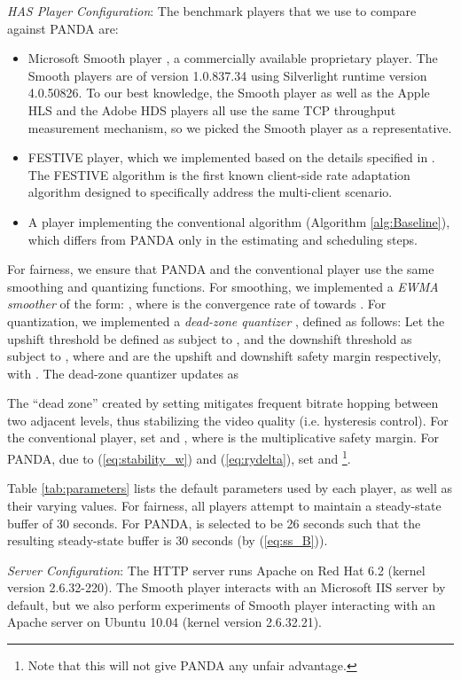 \documentclass[conference]{IEEEtran}
\theoremstyle{plain}
\theoremstyle{definition}
\theoremstyle{plain}
\theoremstyle{plain}
\begin{document}
\emph{HAS Player Configuration}: The benchmark players that we use
to compare against PANDA are:
\begin{itemize}
\item Microsoft Smooth player \cite{MSS}, a commercially available proprietary
player. The Smooth players are of version 1.0.837.34 using Silverlight
runtime version 4.0.50826. To our best knowledge, the Smooth player
as well as the Apple HLS and the Adobe HDS players all use the same
TCP throughput measurement mechanism, so we picked the Smooth player
as a representative.
\item FESTIVE player, which we implemented based on the details specified
in \cite{Jiang:CoNext12}. The FESTIVE algorithm is the first known
client-side rate adaptation algorithm designed to specifically address
the multi-client scenario.
\item A player implementing the conventional algorithm (Algorithm \ref{alg:Baseline}),
which differs from PANDA only in the estimating and scheduling steps.
\end{itemize}
For fairness, we ensure that PANDA and the conventional player use
the same smoothing and quantizing functions. For smoothing, we implemented
a \emph{EWMA} \emph{smoother} of the form: ,
where  is the convergence rate of  towards
. For quantization, we implemented a \emph{dead-zone
quantizer} , defined as follows: Let the
upshift threshold be defined as  subject to , and the downshift threshold
as  subject to , where 
and  are the upshift and downshift safety margin respectively,
with . The dead-zone quantizer
updates  as 

The ``dead zone''  created by setting 
mitigates frequent bitrate hopping between two adjacent levels, thus
stabilizing the video quality (i.e. hysteresis control). For the conventional
player, set  and ,
where  is the multiplicative safety margin. For
PANDA, due to (\ref{eq:stability_w}) and (\ref{eq:rydelta}), set
 and  \footnote{Note that this will not give PANDA any unfair advantage.}.

Table \ref{tab:parameters} lists the default parameters used by each
player, as well as their varying values. For fairness, all players
attempt to maintain a steady-state buffer of 30 seconds. For PANDA,
 is selected to be 26 seconds such that the resulting steady-state
buffer is 30 seconds (by (\ref{eq:ss_B})).

\emph{Server Configuration}: The HTTP server runs Apache on Red Hat
6.2 (kernel version 2.6.32-220). The Smooth player interacts with
an Microsoft IIS server by default, but we also perform experiments
of Smooth player interacting with an Apache server on Ubuntu 10.04
(kernel version 2.6.32.21).
\end{document}
